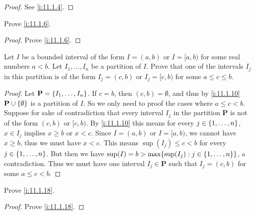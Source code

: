 \begin{proof}
  See \cref{i:11.1.4}.
\end{proof}

\begin{ex}\label{i:ex:11.1.2}
  Prove \cref{i:11.1.6}.
\end{ex}

\begin{proof}
  Prove \cref{i:11.1.6}.
\end{proof}

\begin{ex}\label{i:ex:11.1.3}
  Let \(I\) be a bounded interval of the form \(I = (a, b)\) or \(I = [a, b)\) for some real numbers \(a < b\).
  Let \(I_1, \dots, I_n\) be a partition of \(I\).
  Prove that one of the intervals \(I_j\) in this partition is of the form \(I_j = (c, b)\) or \(I_j = [c, b)\) for some \(a \leq c \leq b\).
\end{ex}

\begin{proof}
  Let \(\mathbf{P} = \left\lbrace I_1, \dots, I_n\right\rbrace\).
  If \(c = b\), then \((c, b) = \emptyset\), and thus by \cref{i:11.1.10} \(\mathbf{P} \cup \left\lbrace\emptyset\right\rbrace\) is a partition of \(I\).
  So we only need to proof the cases where \(a \leq c < b\).
  Suppose for sake of contradiction that every interval \(I_j\) in the partition \(\mathbf{P}\) is not of the form \((c, b)\) or \([c, b)\).
  By \cref{i:11.1.10} this means for every \(j \in \left\lbrace1, \dots, n\right\rbrace\), \(x \in I_j\) implies \(x \geq b\) or \(x < c\).
  Since \(I = (a, b)\) or \(I = [a, b)\), we cannot have \(x \geq b\), thus we must have \(x < c\).
  This means \(\sup(I_j) \leq c < b\) for every \(j \in \left\lbrace1, \dots, n\right\rbrace\).
  But then we have \(\sup(I) = b > \max\set{\sup(I_j) : j \in \set{1, \dots, n}}\), a contradiction.
  Thus we must have one interval \(I_j \in \mathbf{P}\) such that \(I_j = (c, b)\) for some \(a \leq c < b\).
\end{proof}

\begin{ex}\label{i:ex:11.1.4}
  Prove \cref{i:11.1.18}.
\end{ex}

\begin{proof}
  Prove \cref{i:11.1.18}.
\end{proof}
